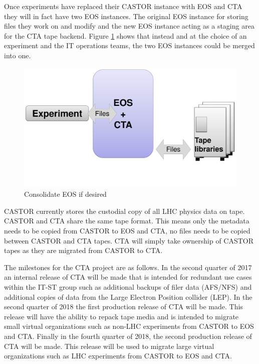 \documentclass[a4paper]{jpconf}
\begin{document}
Once experiments have replaced their CASTOR instance with EOS and CTA they
will in fact have two EOS instances.  The original EOS instance for storing
files they work on and modify and the new EOS instance acting as a staging
area for the CTA tape backend. Figure \ref{consolidated} shows that instead and
at the choice of an experiment and the IT operations teams, the two EOS
instances could be merged into one.

\begin{figure}[h]
\centering
\includegraphics[scale=0.18, trim=0mm 60mm 0mm 0mm, clip]{CTA_consolidated_deployment.pdf}
\caption{\label{consolidated}Consolidate EOS if desired}
\end{figure}

CASTOR currently stores the custodial copy of all LHC physics data on tape.
CASTOR and CTA share the same tape format.  This means only the metadata
needs to be copied from CASTOR to EOS and CTA, no files needs to be copied
between CASTOR and CTA tapes.  CTA will simply take ownership of CASTOR
tapes as they are migrated from CASTOR to CTA.

The milestones for the CTA project are as follows.  In the second quarter of
2017 an internal release of CTA will be made that is intended for redundant use
cases within the IT-ST  group such as additional backups of filer data (AFS/NFS)
and additional copies of data from the Large Electron Position collider (LEP).
In the second quarter of 2018 the first production release of CTA will be made.
This release will have the ability to repack tape media and is intended to
migrate small virtual organizations such as non-LHC experiments from CASTOR to
EOS and CTA.  Finally in the fourth quarter of 2018, the second production
release of CTA will be made.  This release will be used to migrate large virtual
organizations such as LHC experiments from CASTOR to EOS and CTA.
\end{document}

